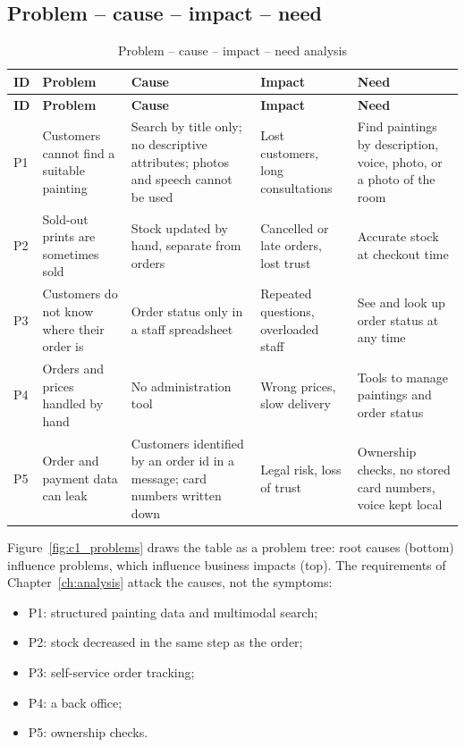 \subsection{Problem -- cause -- impact -- need}

\begin{longtable}{@{}P{0.8cm}P{3.4cm}P{3.6cm}P{3.4cm}P{3.8cm}@{}}
\caption{Problem -- cause -- impact -- need analysis}\label{tab:pcin}\\
\toprule
\textbf{ID} & \textbf{Problem} & \textbf{Cause} & \textbf{Impact} & \textbf{Need}\\
\midrule
\endfirsthead
\toprule
\textbf{ID} & \textbf{Problem} & \textbf{Cause} & \textbf{Impact} & \textbf{Need}\\
\midrule
\endhead
\small P1 & \small Customers cannot find a suitable painting & \small Search by title only; no descriptive attributes; photos and speech cannot be used & \small Lost customers, long consultations & \small Find paintings by description, voice, photo, or a photo of the room\\
\small P2 & \small Sold-out prints are sometimes sold & \small Stock updated by hand, separate from orders & \small Cancelled or late orders, lost trust & \small Accurate stock at checkout time\\
\small P3 & \small Customers do not know where their order is & \small Order status only in a staff spreadsheet & \small Repeated questions, overloaded staff & \small See and look up order status at any time\\
\small P4 & \small Orders and prices handled by hand & \small No administration tool & \small Wrong prices, slow delivery & \small Tools to manage paintings and order status\\
\small P5 & \small Order and payment data can leak & \small Customers identified by an order id in a message; card numbers written down & \small Legal risk, loss of trust & \small Ownership checks, no stored card numbers, voice kept local\\
\bottomrule
\end{longtable}

Figure~\ref{fig:c1_problems} draws the table as a problem tree: root causes (bottom) influence problems, which
influence business impacts (top). The requirements of Chapter~\ref{ch:analysis} attack the causes, not the symptoms:
\begin{itemize}
\item P1: structured painting data and multimodal search;
\item P2: stock decreased in the same step as the order;
\item P3: self-service order tracking;
\item P4: a back office;
\item P5: ownership checks.
\end{itemize}

